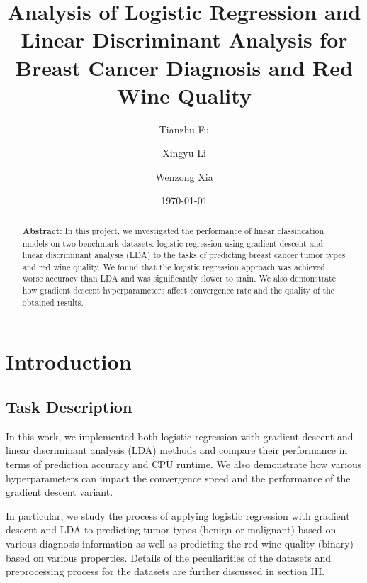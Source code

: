\documentclass[%
 aps,
 amsmath,amssymb,
 reprint,%
 twocolumn
]{revtex4-1}
\begin{document}

\title[]{Analysis of Logistic Regression and Linear Discriminant Analysis for Breast Cancer Diagnosis and Red Wine Quality}%

\author{Tianzhu Fu}
\author{Xingyu Li}%
\author{Wenzong Xia}

\date{\today}%

\begin{abstract}
\textbf{Abstract}: In this project, we investigated the performance of linear classification models on two benchmark datasets: logistic regression using gradient descent and linear discriminant analysis (LDA) to the tasks of predicting breast cancer tumor types and red wine quality. We found that the logistic regression approach was achieved worse accuracy than LDA and was significantly slower to train. We also demonstrate how gradient descent hyperparameters affect convergence rate and the quality of the obtained results. 
\end{abstract}
\maketitle
\raggedbottom

\section{Introduction}
\subsection*{\label{sec:level2}Task Description}
In this work, we implemented both logistic regression with gradient descent and linear discriminant analysis (LDA) methods and compare their performance in terms of prediction accuracy and CPU runtime. We also demonstrate how various hyperparameters can impact the convergence speed and the performance of the gradient descent variant. \par

In particular, we study the process of applying logistic regression with gradient descent and LDA to predicting tumor types (benign or malignant) based on various diagnosis information as well as predicting the red wine quality (binary) based on various properties. Details of the peculiarities of the datasets and preprocessing process for the datasets are further discussed in section III.
\end{document}

